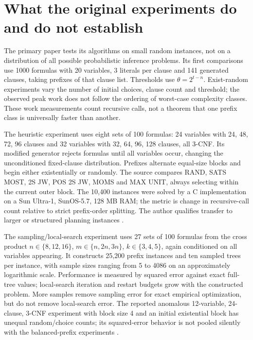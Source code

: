\section{What the original experiments do and do not establish}
\label{sec:p15-ssat-experiments}

The primary paper tests its algorithms on small random instances, not
on a distribution of all possible probabilistic inference problems.
Its first comparisons use 1000 formulas with 20 variables, 3 literals per
clause and 141 generated clauses, taking prefixes of that clause list.
Thresholds use \(\theta=2^{t-n}\). Exist-random experiments vary
the number of initial choices, clause count and threshold; the observed
peak work does not follow the ordering of worst-case complexity classes.
These work measurements count recursive calls, not a theorem that one
prefix class is universally faster than another.

The heuristic experiment uses eight sets of 100 formulas: 24 variables
with 24, 48, 72, 96 clauses and 32 variables with 32, 64, 96, 128 clauses, all
3-CNF. Its modified generator rejects formulas until all variables
occur, changing the unconditioned fixed-clause distribution. Prefixes
alternate equal-size blocks and begin either existentially or randomly.
The source compares RAND, SATS MOST, 2S JW, POS 2S JW, MOMS and MAX UNIT,
always selecting within the current outer block. The 10,400 instances
were solved by a C implementation on a Sun Ultra-1, SunOS-5.7,
128 MB RAM; the metric is change in recursive-call count relative to
strict prefix-order splitting. The author qualifies transfer to larger
or structured planning instances
\cite[sec.~3.3, pp.~36--41]{LittmanMajercikPitassi2000SSATAuthor}.

The sampling/local-search experiment uses 27 sets of 100 formulas from
the cross product \(n\in\{8,12,16\}\),
\(m\in\{n,2n,3n\}\), \(k\in\{3,4,5\}\), again conditioned
on all variables appearing. It constructs 25,200 prefix instances and
ten sampled trees per instance, with sample sizes ranging from 5 to 4086
on an approximately logarithmic scale. Performance is measured by
squared error against exact full-tree values; local-search iteration
and restart budgets grow with the constructed problem. More samples
remove sampling error for exact empirical optimization, but do not
remove local-search error. The reported anomalous 12-variable, 24-clause,
3-CNF experiment with block size 4 and an initial existential block
has unequal random/choice counts; its squared-error behavior is not
pooled silently with the balanced-prefix experiments
\cite[sec.~3.4, pp.~42--45]{LittmanMajercikPitassi2000SSATAuthor}.


